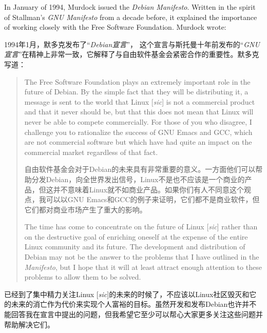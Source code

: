 \ifdefined\eng
In January of 1994, Murdock issued the \textit{Debian Manifesto}. Written in the spirit of Stallman's \textit{GNU Manifesto} from a decade before, it explained the importance of working closely with the Free Software Foundation. Murdock wrote:
\fi

\ifdefined\chs
1994年1月，默多克发布了``\textit{Debian宣言}''， 这个宣言与斯托曼十年前发布的``\textit{GNU宣言}''在精神上非常一致，它解释了与自由软件基金会紧密合作的重要性。默多克写道：
\fi

\ifdefined\eng
\begin{quote}
The Free Software Foundation plays an extremely important role in the future of Debian. By the simple fact that they will be distributing it, a message is sent to the world that Linux [\textit{sic}] is not a commercial product and that it never should be, but that this does not mean that Linux will never be able to compete commercially. For those of you who disagree, I challenge you to rationalize the success of GNU Emacs and GCC, which are not commercial software but which have had quite an impact on the commercial market regardless of that fact.
\fi

\ifdefined\chs
自由软件基金会对于Debian的未来具有非常重要的意义。一方面他们可以帮助分发Debian，向全世界发出信号，Linux不是也不应该是一个商业的产品，但这并不意味着Linux就不如商业产品。如果你们有人不同意这个观点，我可以以GNU Emacs和GCC的例子来证明，它们都不是商业软件，但它们都对商业市场产生了重大的影响。
\fi

\ifdefined\eng
The time has come to concentrate on the future of Linux [\textit{sic}] rather than on the destructive goal of enriching oneself at the expense of the entire Linux community and its future. The development and distribution of Debian may not be the answer to the problems that I have outlined in the \textit{Manifesto}, but I hope that it will at least attract enough attention to these problems to allow them to be solved.
\end{quote}
\fi

\ifdefined\chs
已经到了集中精力关注Linux [\textit{sic}]的未来的时候了，不应该以Linux社区毁灭和它的未来的消亡作为代价来实现个人富裕的目标。虽然开发和发布Debian也许并不能回答我在宣言中提出的问题，但我希望它至少可以帮心大家更多关注这些问题并帮助解决它们。
\fi

